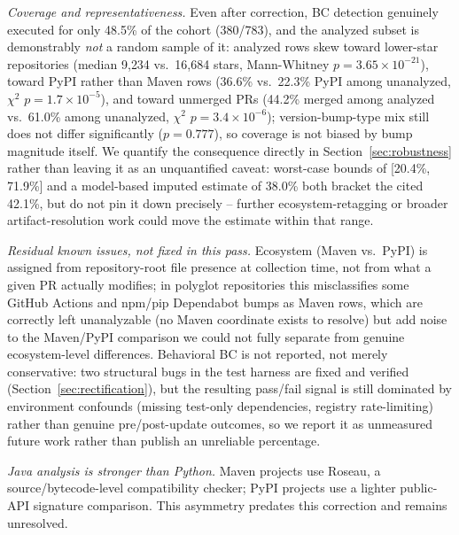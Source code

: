 \documentclass[10pt,journal]{IEEEtran}
\begin{document}
\emph{Coverage and representativeness.} Even after correction, BC detection genuinely executed for only 48.5\% of the cohort (380/783), and the analyzed subset is demonstrably \emph{not} a random sample of it: analyzed rows skew toward lower-star repositories (median 9{,}234 vs.\ 16{,}684 stars, Mann-Whitney $p=3.65\times10^{-21}$), toward PyPI rather than Maven rows (36.6\% vs.\ 22.3\% PyPI among unanalyzed, $\chi^2$ $p=1.7\times10^{-5}$), and toward unmerged PRs (44.2\% merged among analyzed vs.\ 61.0\% among unanalyzed, $\chi^2$ $p=3.4\times10^{-6}$); version-bump-type mix still does not differ significantly ($p=0.777$), so coverage is not biased by bump magnitude itself. We quantify the consequence directly in Section~\ref{sec:robustness} rather than leaving it as an unquantified caveat: worst-case bounds of [20.4\%, 71.9\%] and a model-based imputed estimate of 38.0\% both bracket the cited 42.1\%, but do not pin it down precisely -- further ecosystem-retagging or broader artifact-resolution work could move the estimate within that range.

\emph{Residual known issues, not fixed in this pass.} Ecosystem (Maven vs.\ PyPI) is assigned from repository-root file presence at collection time, not from what a given PR actually modifies; in polyglot repositories this misclassifies some GitHub Actions and npm/pip Dependabot bumps as Maven rows, which are correctly left unanalyzable (no Maven coordinate exists to resolve) but add noise to the Maven/PyPI comparison we could not fully separate from genuine ecosystem-level differences. Behavioral BC is not reported, not merely conservative: two structural bugs in the test harness are fixed and verified (Section~\ref{sec:rectification}), but the resulting pass/fail signal is still dominated by environment confounds (missing test-only dependencies, registry rate-limiting) rather than genuine pre/post-update outcomes, so we report it as unmeasured future work rather than publish an unreliable percentage.

\emph{Java analysis is stronger than Python.} Maven projects use Roseau, a source/bytecode-level compatibility checker; PyPI projects use a lighter public-API signature comparison. This asymmetry predates this correction and remains unresolved.
\end{document}
